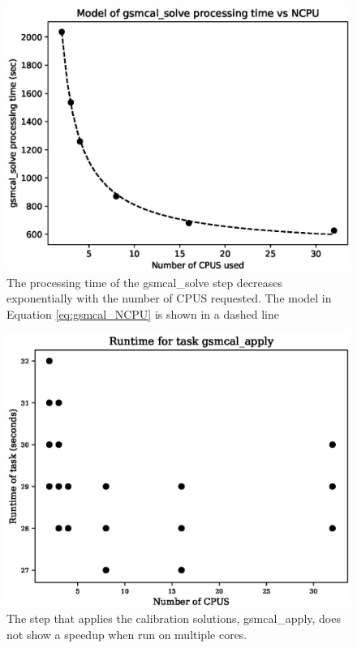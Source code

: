 \documentclass[preprint,5p]{elsarticle}
\begin{document}
\begin{figure}
    \includegraphics[width=0.95\linewidth]{figures/gsmcal_NCPU_and_model.eps}
      \caption{The processing time of the gsmcal\_solve step decreases exponentially with the number of CPUS requested. The model in Equation \ref{eq:gsmcal_NCPU} is shown in a dashed line}
	\label{fig:gsmcal_solve_NCPU}
\end{figure}

\begin{figure}
    \includegraphics[width=0.95\linewidth]{figures/gsmcal_apply_NCPU.eps}
      \caption{The step that applies the calibration solutions, gsmcal\_apply, does not show a speedup when run on multiple cores. }
	\label{fig:gsmcal_apply_NCPU}
\end{figure}
\end{document}
